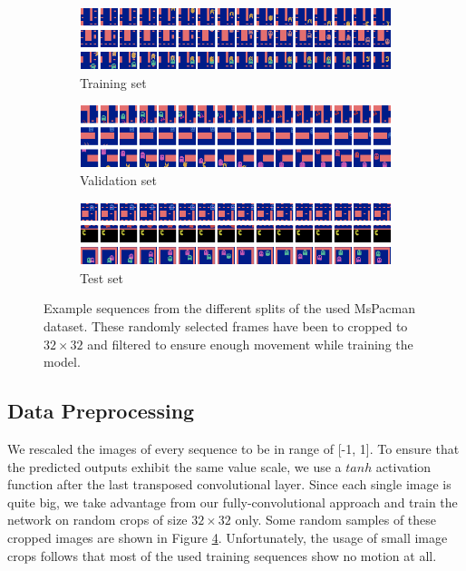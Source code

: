 \begin{figure}[htb]
\centering
\begin{subfigure}{1.0\textwidth}
  \centering
  \includegraphics[width=1.0\linewidth]{figures/ds/pac_train.png}
  \caption{Training set}
  \label{fig:pac_train}
  \vspace{.1cm}
\end{subfigure}
\begin{subfigure}{1.0\textwidth}
  \centering
  \includegraphics[width=1.0\linewidth]{figures/ds/pac_valid.png}
  \caption{Validation set}
  \label{fig:pac_valid}
  \vspace{.1cm}
\end{subfigure}
\begin{subfigure}{1.0\textwidth}
  \centering
  \includegraphics[width=1.0\linewidth]{figures/ds/pac_test.png}
  \caption{Test set}
  \label{fig:pac_test}
\end{subfigure}
\caption[MsPacman Crop Image Samples]{Example sequences from the different splits of the used MsPacman dataset. These randomly selected frames have been to cropped to $32 \times 32 $ and filtered to ensure enough movement while training the model.}
\label{fig:pacman}
\end{figure}


\subsection{Data Preprocessing} \label{sec:pacman_preprocessing}

We rescaled the images of every sequence to be in range of [-1, 1]. To ensure that the predicted outputs exhibit the same value scale, we use a $tanh$ activation function after the last transposed convolutional layer. Since each single image is quite big, we take advantage from our fully-convolutional approach and train the network on random crops of size $ 32 \times 32 $ only. Some random samples of these cropped images are shown in Figure \ref{fig:pacman}. Unfortunately, the usage of small image crops follows that most of the used training sequences show no motion at all.

